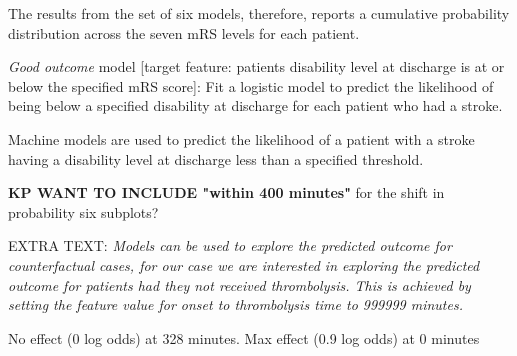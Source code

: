 The results from the set of six models, therefore, reports a cumulative probability distribution across the seven mRS levels for each patient. 

\textit{Good outcome} model [target feature: patients disability level at discharge is at or below the specified mRS score]: Fit a logistic model to predict the likelihood of being below a specified disability at discharge for each patient who had a stroke. 

Machine models are used to predict the likelihood of a patient with a stroke having a disability level at discharge less than a specified threshold.


\textbf{KP WANT TO INCLUDE "within 400 minutes"} for the shift in probability six subplots?



EXTRA TEXT: \textit{Models can be used to explore the predicted outcome for counterfactual cases, for our case we are interested in exploring the predicted outcome for patients had they not received thrombolysis. This is achieved by setting the feature value for onset to thrombolysis time to 999999 minutes.}


No effect (0 log odds) at 328 minutes. Max effect (0.9 log odds) at 0 minutes




